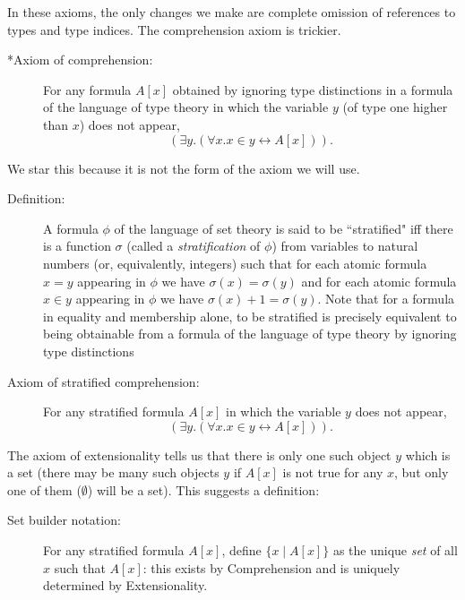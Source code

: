 \documentclass[12pt]{book}
\begin{document}
In these axioms, the only changes we make are complete omission of references to types and type indices.  The comprehension axiom is trickier.

\begin{description}
\item[*Axiom of comprehension:] 

For any formula $A[x]$ obtained by ignoring type distinctions in a formula of the language of type theory in which the
variable $y$ (of type one higher than $x$) does not appear, $$(\exists
y.(\forall x.x \in y \leftrightarrow A[x])).$$

\end{description}

We star this because it is not the form of the axiom we will use.

\begin{description}

\item[Definition:]  A formula $\phi$ of the language of set theory is said to be ``stratified" iff there is a function $\sigma$ (called a {\em stratification\/} of $\phi$)
from variables to natural numbers (or, equivalently, integers) such that for each atomic formula $x=y$ appearing in $\phi$ we have $\sigma(x)=\sigma(y)$ and for
each atomic formula $x \in y$ appearing in $\phi$ we have $\sigma(x)+1 = \sigma(y)$.  Note that for a formula in equality and membership alone, to be stratified
is precisely equivalent to being obtainable from a formula of the language of type theory by ignoring type distinctions

\item[Axiom of stratified comprehension:]  For any stratified formula $A[x]$ in which the variable $y$ does not appear, $$(\exists
y.(\forall x.x \in y \leftrightarrow A[x])).$$

\end{description}

The axiom of extensionality tells us that there is only one such
object $y$ which is a set (there may be many such objects $y$ if
$A[x]$ is not true for any $x$, but only one of them ($\emptyset$)
will be a set). This suggests a definition:

\begin{description}

\item[Set builder notation:] For any stratified formula $A[x]$, define $\{x \mid
A[x]\}$ as the unique {\em set\/} of all $x$ such that $A[x]$: this exists by
Comprehension and is uniquely determined by Extensionality. 

\end{description}
\end{document}
